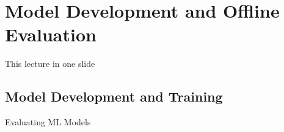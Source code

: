 
\section[Model Development]{Model Development and Offline Evaluation}


\begin{frame}{This lecture in one slide}
  \begin{withmargin}
    \begin{tdmain}
    \end{tdmain}
    \begin{tdmargin}
    \end{tdmargin}
  \end{withmargin}
\end{frame}

\subsection{Model Development and Training}

\begin{frame}{Evaluating ML Models}
  \begin{withmargin}
    \begin{tdmain}
    \end{tdmain}
    \begin{tdmargin}
    \end{tdmargin}
  \end{withmargin}
\end{frame}


